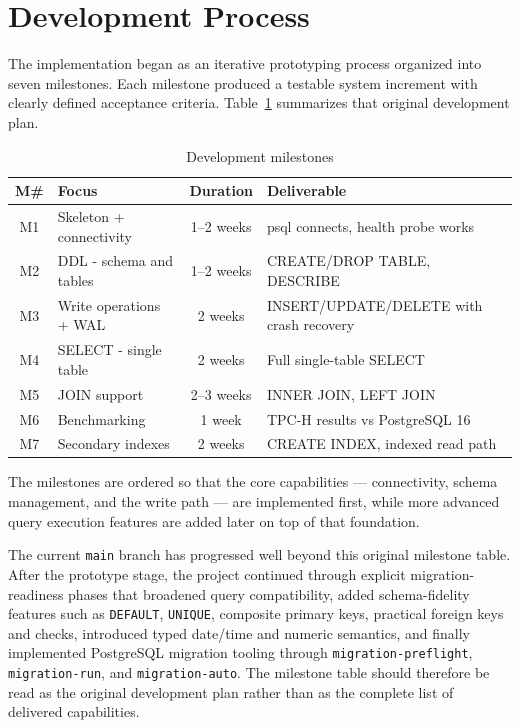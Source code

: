 \section{Development Process}

The implementation began as an iterative prototyping process organized into seven milestones. Each milestone produced a testable system increment with clearly defined acceptance criteria. Table~\ref{tab:milestones} summarizes that original development plan.

\begin{table}[H]
\centering
\caption{Development milestones}
\label{tab:milestones}
\renewcommand{\arraystretch}{1.4}
\small
\begin{tabular}{|c|p{3.5cm}|c|p{5cm}|}
\hline
\textbf{M\#} & \textbf{Focus} & \textbf{Duration} & \textbf{Deliverable} \\
\hline
M1 & Skeleton + connectivity & 1--2 weeks & psql connects, health probe works \\
\hline
M2 & DDL - schema and tables & 1--2 weeks & CREATE/DROP TABLE, DESCRIBE \\
\hline
M3 & Write operations + WAL & 2 weeks & INSERT/UPDATE/DELETE with crash recovery \\
\hline
M4 & SELECT - single table & 2 weeks & Full single-table SELECT \\
\hline
M5 & JOIN support & 2--3 weeks & INNER JOIN, LEFT JOIN \\
\hline
M6 & Benchmarking & 1 week & TPC-H results vs PostgreSQL 16 \\
\hline
M7 & Secondary indexes & 2 weeks & CREATE INDEX, indexed read path \\
\hline
\end{tabular}
\end{table}

The milestones are ordered so that the core capabilities --- connectivity, schema management, and the write path --- are implemented first, while more advanced query execution features are added later on top of that foundation.

The current \texttt{main} branch has progressed well beyond this original milestone table. After the prototype stage, the project continued through explicit migration-readiness phases that broadened query compatibility, added schema-fidelity features such as \texttt{DEFAULT}, \texttt{UNIQUE}, composite primary keys, practical foreign keys and checks, introduced typed date/time and numeric semantics, and finally implemented PostgreSQL migration tooling through \texttt{migration-preflight}, \texttt{migration-run}, and \texttt{migration-auto}. The milestone table should therefore be read as the original development plan rather than as the complete list of delivered capabilities.

